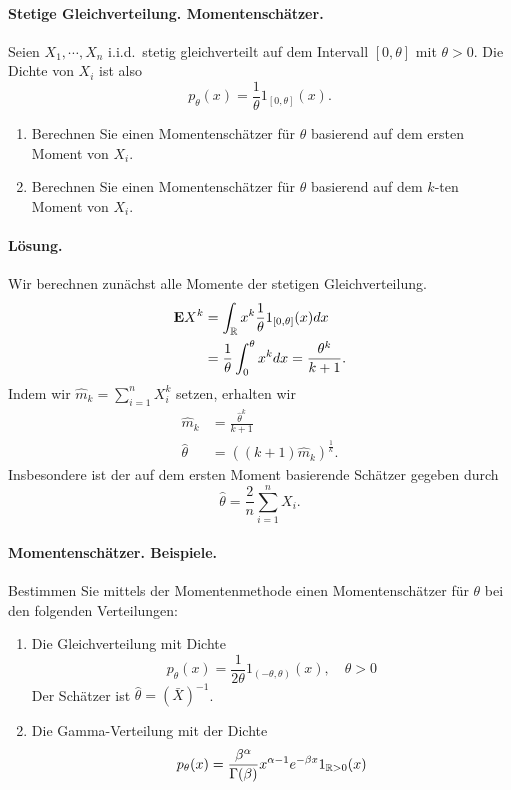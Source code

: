 \paragraph{Stetige Gleichverteilung. Momentenschätzer. } Seien $X_1, \cdots, X_n$ 
i.i.d.\ stetig gleichverteilt auf dem Intervall $[0,\theta]$ mit $\theta>0$. 
Die Dichte von $X_i$ ist also 
\begin{equation*}
    p_{\theta}(x) = \frac{1}{\theta} 1_{[0,\theta]}(x).
\end{equation*}
\begin{enumerate}
    \item Berechnen Sie einen Momentenschätzer für $\theta$ basierend auf dem 
        ersten Moment von $X_i$. 
    \item Berechnen Sie einen Momentenschätzer für $\theta$ basierend auf dem 
        $k$-ten Moment von $X_i$. 
\end{enumerate}

\paragraph*{Lösung.} Wir berechnen zunächst alle Momente der stetigen Gleichverteilung. 
\begin{align*}
    \mathbf{E} X^k &= \int_{\mathbb R} x^k \frac{1}{\theta} 1_{[0,\theta]} (x) dx \\
    &= \frac{1}{\theta} \int_{0}^\theta x^k dx = \frac{\theta^k}{k+1}. 
\end{align*}
Indem wir $\hat m_{k} = \sum_{i=1}^{n} X_i^k$ setzen, erhalten wir
\begin{align*}
    \hat m_k &= \frac{\hat\theta^k}{k+1} \\
    \hat \theta &= \left( (k+1) \hat m_k \right)^{\frac{1}{k}}.
\end{align*}
Insbesondere ist der auf dem ersten Moment basierende Schätzer gegeben durch
\begin{equation*}
    \hat \theta = \frac{2}{n} \sum_{i=1}^{n} X_i.
\end{equation*}



\paragraph{Momentenschätzer. Beispiele.} Bestimmen Sie mittels der Momentenmethode
einen Momentenschätzer für $\theta$ bei den folgenden Verteilungen: 
\begin{enumerate}
	\item Die Gleichverteilung mit Dichte
		\begin{equation*}
			p_\theta(x) = \frac{1}{ 2\theta } 1_{(-\theta,\theta)}(x), \quad \theta>0
		\end{equation*}
		Der Schätzer ist $\hat \theta = \left( \bar X \right)^{-1}$.
	\item Die Gamma-Verteilung mit der Dichte 
		\begin{equation*}
			p_\theta(x) = \frac{\beta^\alpha}{ \Gamma(\beta)} x^{\alpha-1} e^{-\beta x}1_{\mathbb R>0}(x)
		\end{equation*}
\end{enumerate}

